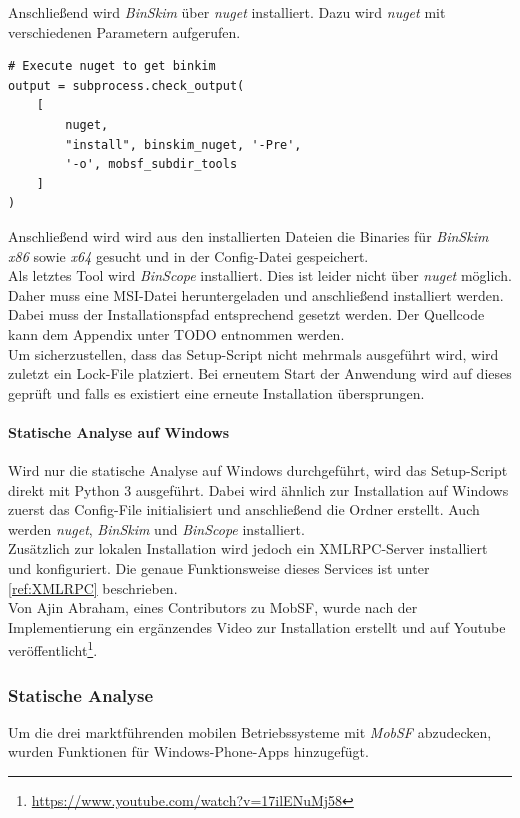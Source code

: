 Anschließend wird \textit{BinSkim} über \textit{nuget} installiert. Dazu wird \textit{nuget} mit verschiedenen Parametern aufgerufen.
\begin{lstlisting}
# Execute nuget to get binkim
output = subprocess.check_output(
    [
        nuget,
        "install", binskim_nuget, '-Pre',
        '-o', mobsf_subdir_tools
    ]
)
\end{lstlisting}
Anschließend wird wird aus den installierten Dateien die Binaries für \textit{BinSkim} \textit{x86} sowie \textit{x64} gesucht und in der Config-Datei gespeichert.\\

Als letztes Tool wird \textit{BinScope} installiert. Dies ist leider nicht über \textit{nuget} möglich. Daher muss eine MSI-Datei heruntergeladen und anschließend installiert werden. Dabei muss der Installationspfad entsprechend gesetzt werden. Der Quellcode kann dem Appendix unter TODO entnommen werden.\\

Um sicherzustellen, dass das Setup-Script nicht mehrmals ausgeführt wird, wird zuletzt ein Lock-File platziert. Bei erneutem Start der Anwendung wird auf dieses geprüft und falls es existiert eine erneute Installation übersprungen.

\paragraph{Statische Analyse auf Windows}
Wird nur die statische Analyse auf Windows durchgeführt, wird das Setup-Script direkt mit Python 3 ausgeführt. Dabei wird ähnlich zur Installation auf Windows zuerst das Config-File initialisiert und anschließend die Ordner erstellt. Auch werden \textit{nuget}, \textit{BinSkim} und \textit{BinScope} installiert.\\

Zusätzlich zur lokalen Installation wird jedoch ein XMLRPC-Server installiert und konfiguriert. Die genaue Funktionsweise dieses Services ist unter \ref{ref:XMLRPC} beschrieben.\\

Von Ajin Abraham, eines Contributors zu MobSF, wurde nach der Implementierung ein ergänzendes Video zur Installation erstellt und auf Youtube veröffentlicht\footnote{\url{https://www.youtube.com/watch?v=17ilENuMj58}}.

\subsubsection{Statische Analyse}
Um die drei marktführenden mobilen Betriebssysteme mit \textit{MobSF} abzudecken, wurden Funktionen für Windows-Phone-Apps hinzugefügt.

